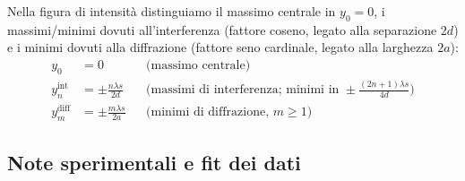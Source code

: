 \documentclass[openany,a4paper,12pt]{book}
\begin{document}
Nella figura di intensità distinguiamo il massimo centrale in $y_0 = 0$, i massimi/minimi dovuti all'interferenza (fattore coseno, legato alla separazione $2d$) e i minimi dovuti alla diffrazione (fattore seno cardinale, legato alla larghezza $2a$):
\begin{align*}
    y_0 &= 0 && \text{(massimo centrale)} \\
    y_n^{\text{int}} &= \pm \frac{n \lambda s}{2d} && \text{(massimi di interferenza; minimi in } \pm\tfrac{(2n+1)\lambda s}{4d}\text{)} \\
    y_m^{\text{diff}} &= \pm \frac{m \lambda s}{2a} && \text{(minimi di diffrazione, } m \ge 1\text{)}
\end{align*}

\subsection*{Note sperimentali e fit dei dati}
\end{document}
